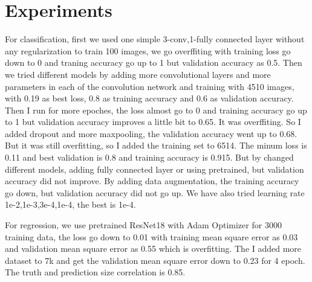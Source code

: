 \documentclass[10pt,twocolumn,letterpaper]{article}
\begin{document}

 \section{Experiments}
For classification, first we used one simple 3-conv,1-fully connected layer without any regularization to train 100 images, we go overffiting with training loss go down to 0 and traning accuracy go up to 1 but validation accuracy as 0.5. Then we tried different models by adding more convolutional layers and more parameters in each of the convolution network and training with 4510 images, with 0.19 as best loss, 0.8 as training accuracy and 0.6 as validation accuracy.  Then I run for more epoches, the loss almost go to 0 and training accuracy go up to 1 but validation accuracy improves a little bit to 0.65. It was overffiting. So I added dropout and more maxpooling, the validation accuracy went up to 0.68. But it was still overfitting, so I added the training set to 6514. The minum loss is 0.11 and best validation is 0.8 and training accuracy is 0.915. But by changed different models, adding fully connected layer or using pretrained, but validation accuracy did not improve. By adding data augmentation, the training accuracy go down, but validation accuracy did not go up. 
We have also tried learning rate 1e-2,1e-3,3e-4,1e-4, the best is 1e-4.

For regression, we use pretrained ResNet18 with Adam Optimizer for 3000 training data, the loss go down to 0.01 with training mean square error as 0.03 and validation mean square error as 0.55 which is overfitting. The I added more dataset to 7k and get the validation mean square error down to 0.23 for 4 epoch. The truth and prediction size correlation is 0.85. 
\end{document}
